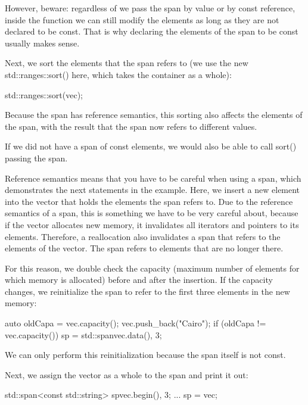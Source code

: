 However, beware: regardless of we pass the span by value or by const reference, inside the function we can still modify the elements as long as they are not declared to be const. That is why declaring the elements of the span to be const usually makes sense.


Next, we sort the elements that the span refers to (we use the new std::ranges::sort() here, which takes the container as a whole):

\begin{cpp}
std::ranges::sort(vec);
\end{cpp}

Because the span has reference semantics, this sorting also affects the elements of the span, with the result that the span now refers to different values.

If we did not have a span of const elements, we would also be able to call sort() passing the span.

Reference semantics means that you have to be careful when using a span, which demonstrates the next statements in the example. Here, we insert a new element into the vector that holds the elements the span refers to. Due to the reference semantics of a span, this is something we have to be very careful about, because if the vector allocates new memory, it invalidates all iterators and pointers to its elements. Therefore, a reallocation also invalidates a span that refers to the elements of the vector. The span refers to elements that are no longer there.

For this reason, we double check the capacity (maximum number of elements for which memory is allocated) before and after the insertion. If the capacity changes, we reinitialize the span to refer to the first three elements in the new memory:

\begin{cpp}
auto oldCapa = vec.capacity();
vec.push_back("Cairo");
if (oldCapa != vec.capacity()) {
	sp = std::span{vec.data(), 3};
}
\end{cpp}

We can only perform this reinitialization because the span itself is not const.


Next, we assign the vector as a whole to the span and print it out:

\begin{cpp}
std::span<const std::string> sp{vec.begin(), 3};
...
sp = vec;
\end{cpp}

